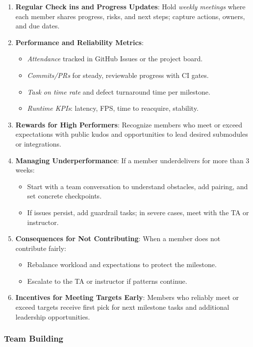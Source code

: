 \documentclass{article}
\begin{document}
\begin{enumerate}
  \item \textbf{Regular Check ins and Progress Updates}: Hold \textit{weekly
    meetings} where each member shares progress, risks, and next steps; capture
    actions, owners, and due dates.
  \item \textbf{Performance and Reliability Metrics}:
    \begin{itemize}
      \item \textit{Attendance} tracked in GitHub Issues or the project board.
      \item \textit{Commits/PRs} for steady, reviewable progress with CI gates.
      \item \textit{Task on time rate} and defect turnaround time per milestone.
      \item \textit{Runtime KPIs}: latency, FPS, time to reacquire, stability.
    \end{itemize}
  \item \textbf{Rewards for High Performers}: Recognize members who meet or
    exceed expectations with public kudos and opportunities to lead desired
    submodules or integrations.
  \item \textbf{Managing Underperformance}: If a member underdelivers for more
    than 3 weeks:
    \begin{itemize}
      \item Start with a team conversation to understand obstacles, add pairing,
        and set concrete checkpoints.
      \item If issues persist, add guardrail tasks; in severe cases, meet with
        the TA or instructor.
    \end{itemize}
  \item \textbf{Consequences for Not Contributing}: When a member does not
    contribute fairly:
    \begin{itemize}
      \item Rebalance workload and expectations to protect the milestone.
      \item Escalate to the TA or instructor if patterns continue.
    \end{itemize}
  \item \textbf{Incentives for Meeting Targets Early}: Members who reliably
    meet or exceed targets receive first pick for next milestone tasks and
    additional leadership opportunities.
\end{enumerate}

\subsubsection*{\color{blue}Team Building}
\end{document}
